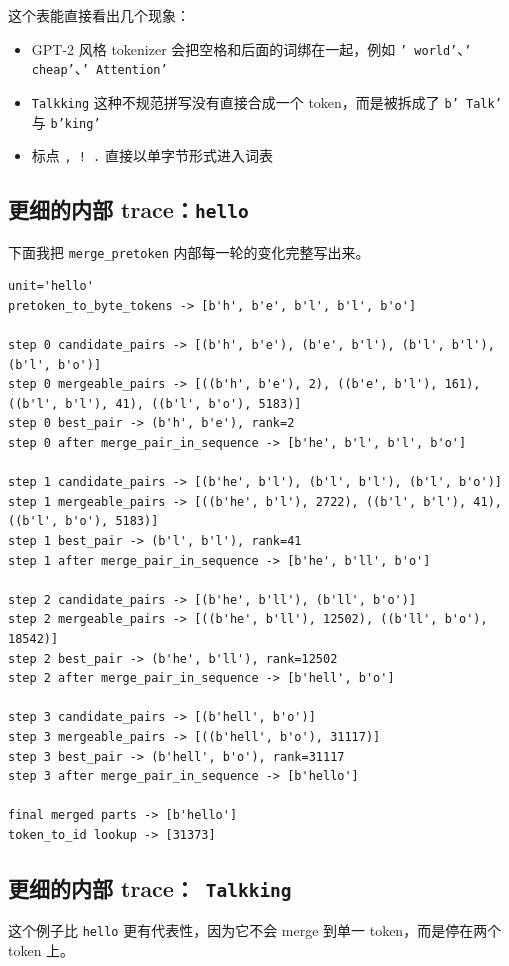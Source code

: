 \documentclass[11pt,a4paper]{ctexart}
\begin{document}
这个表能直接看出几个现象：
\begin{itemize}[leftmargin=2em]
  \item GPT-2 风格 tokenizer 会把空格和后面的词绑在一起，例如 \texttt{' world'}、\texttt{' cheap'}、\texttt{' Attention'}
  \item \texttt{Talkking} 这种不规范拼写没有直接合成一个 token，而是被拆成了 \texttt{b' Talk'} 与 \texttt{b'king'}
  \item 标点 \texttt{, ! .} 直接以单字节形式进入词表
\end{itemize}

\subsection{更细的内部 trace：\texttt{hello}}
下面我把 \texttt{merge\_pretoken} 内部每一轮的变化完整写出来。

\begin{lstlisting}
unit='hello'
pretoken_to_byte_tokens -> [b'h', b'e', b'l', b'l', b'o']

step 0 candidate_pairs -> [(b'h', b'e'), (b'e', b'l'), (b'l', b'l'), (b'l', b'o')]
step 0 mergeable_pairs -> [((b'h', b'e'), 2), ((b'e', b'l'), 161), ((b'l', b'l'), 41), ((b'l', b'o'), 5183)]
step 0 best_pair -> (b'h', b'e'), rank=2
step 0 after merge_pair_in_sequence -> [b'he', b'l', b'l', b'o']

step 1 candidate_pairs -> [(b'he', b'l'), (b'l', b'l'), (b'l', b'o')]
step 1 mergeable_pairs -> [((b'he', b'l'), 2722), ((b'l', b'l'), 41), ((b'l', b'o'), 5183)]
step 1 best_pair -> (b'l', b'l'), rank=41
step 1 after merge_pair_in_sequence -> [b'he', b'll', b'o']

step 2 candidate_pairs -> [(b'he', b'll'), (b'll', b'o')]
step 2 mergeable_pairs -> [((b'he', b'll'), 12502), ((b'll', b'o'), 18542)]
step 2 best_pair -> (b'he', b'll'), rank=12502
step 2 after merge_pair_in_sequence -> [b'hell', b'o']

step 3 candidate_pairs -> [(b'hell', b'o')]
step 3 mergeable_pairs -> [((b'hell', b'o'), 31117)]
step 3 best_pair -> (b'hell', b'o'), rank=31117
step 3 after merge_pair_in_sequence -> [b'hello']

final merged parts -> [b'hello']
token_to_id lookup -> [31373]
\end{lstlisting}

\subsection{更细的内部 trace：\texttt{ Talkking}}
这个例子比 \texttt{hello} 更有代表性，因为它不会 merge 到单一 token，而是停在两个 token 上。
\end{document}
